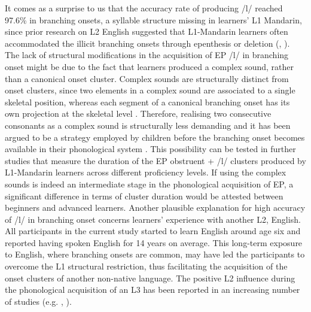 \documentclass[output=paper]{../langscibook}
\begin{document}
It comes as a surprise to us that the accuracy rate of producing /l/ reached 97.6\% in branching onsets, a syllable structure missing in learners’ L1 Mandarin, since prior research on L2 English suggested that L1-Mandarin learners often accommodated the illicit branching onsets through epenthesis or deletion (\citealt{Chen2003}, \citealt{Enochson2014}). The lack of structural modifications in the acquisition of EP /l/ in branching onset might be due to the fact that learners produced a complex sound, rather than a canonical onset cluster. Complex sounds are structurally distinct from onset clusters, since two elements in a complex sound are associated to a single skeletal position, whereas each segment of a canonical branching onset has its own projection at the skeletal level \citep{Selkirk1982}. Therefore, realising two consecutive consonants as a complex sound is structurally less demanding and it has been argued to be a strategy employed by children before the branching onset becomes available in their phonological system \citep{Freitas2003}. This possibility can be tested in further studies that measure the duration of the EP obstruent + /l/ clusters produced by L1-Mandarin learners across different proficiency levels. If using the complex sounds is indeed an intermediate stage in the phonological acquisition of EP, a significant difference in terms of cluster duration would be attested between beginners and advanced learners. Another plausible explanation for high accuracy of /l/ in branching onset concerns learners’ experience with another L2, English. All participants in the current study started to learn English around age six and reported having spoken English for 14 years on average. This long-term exposure to English, where branching onsets are common, may have led the participants to overcome the L1 structural restriction, thus facilitating the acquisition of the onset clusters of another non-native language. The positive L2 influence during the phonological acquisition of an L3 has been reported in an increasing number of studies (e.g. \citealt{Tremblay2007}, \citealt{LlamaEtAl2010}).
\end{document}
